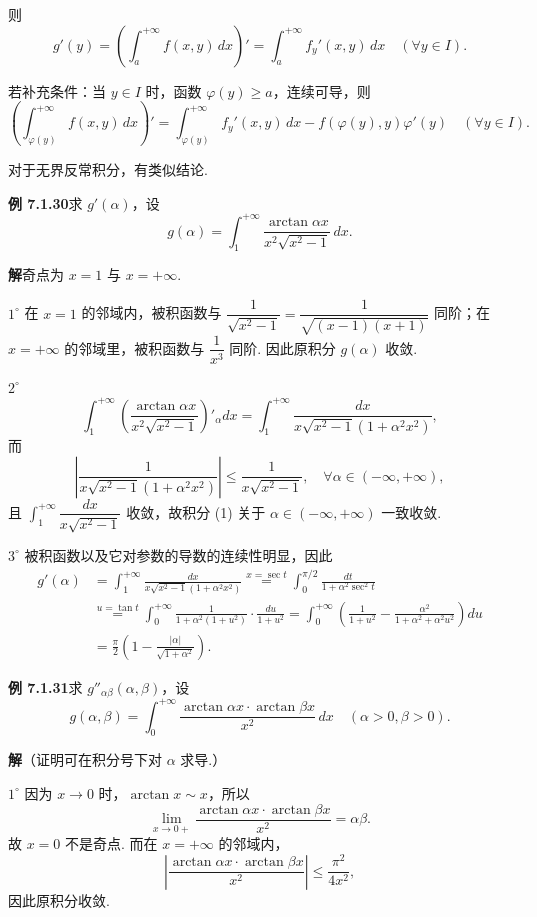 \documentclass[UTF8,12pt,a4paper,fontset=fandol]{ctexart}
\begin{document}
则
\[
g'(y)=\left(\int_a^{+\infty}f(x,y)\,dx\right)'
=\int_a^{+\infty}f_y'(x,y)\,dx\quad(\forall y\in I).
\]

若补充条件：当 $y\in I$ 时，函数 $\varphi(y)\ge a$，连续可导，则
\[
\left(\int_{\varphi(y)}^{+\infty}f(x,y)\,dx\right)'
=\int_{\varphi(y)}^{+\infty}f_y'(x,y)\,dx-f(\varphi(y),y)\varphi'(y)\quad(\forall y\in I).
\]

对于无界反常积分，有类似结论.

\noindent\textbf{例 7.1.30}\quad 求 $g'(\alpha)$，设
\[
g(\alpha)=\int_1^{+\infty}\frac{\arctan\alpha x}{x^2\sqrt{x^2-1}}\,dx.
\]

\noindent\textbf{解}\quad 奇点为 $x=1$ 与 $x=+\infty$.

$1^\circ$ 在 $x=1$ 的邻域内，被积函数与 $\dfrac1{\sqrt{x^2-1}}=\dfrac1{\sqrt{(x-1)(x+1)}}$ 同阶；在 $x=+\infty$ 的邻域里，被积函数与 $\dfrac1{x^3}$ 同阶. 因此原积分 $g(\alpha)$ 收敛.

$2^\circ$
\[
\int_1^{+\infty}\left(\frac{\arctan\alpha x}{x^2\sqrt{x^2-1}}\right)'_\alpha dx
=\int_1^{+\infty}\frac{dx}{x\sqrt{x^2-1}(1+\alpha^2x^2)},
\tag{1}
\]
而
\[
\left|\frac1{x\sqrt{x^2-1}(1+\alpha^2x^2)}\right|
\le\frac1{x\sqrt{x^2-1}},\quad \forall\alpha\in(-\infty,+\infty),
\]
且 $\displaystyle\int_1^{+\infty}\dfrac{dx}{x\sqrt{x^2-1}}$ 收敛，故积分 (1) 关于 $\alpha\in(-\infty,+\infty)$ 一致收敛.

$3^\circ$ 被积函数以及它对参数的导数的连续性明显，因此
\[
\begin{aligned}
g'(\alpha)
&=\int_1^{+\infty}\frac{dx}{x\sqrt{x^2-1}(1+\alpha^2x^2)}
\overset{x=\sec t}{=}\int_0^{\pi/2}\frac{dt}{1+\alpha^2\sec^2 t}\\
&\overset{u=\tan t}{=}\int_0^{+\infty}\frac1{1+\alpha^2(1+u^2)}\cdot\frac{du}{1+u^2}
=\int_0^{+\infty}\left(\frac1{1+u^2}-\frac{\alpha^2}{1+\alpha^2+\alpha^2u^2}\right)du\\
&=\frac{\pi}{2}\left(1-\frac{|\alpha|}{\sqrt{1+\alpha^2}}\right).
\end{aligned}
\]

\noindent\textbf{例 7.1.31}\quad 求 $g''_{\alpha\beta}(\alpha,\beta)$，设
\[
g(\alpha,\beta)=\int_0^{+\infty}\frac{\arctan\alpha x\cdot\arctan\beta x}{x^2}\,dx\quad(\alpha>0,\beta>0).
\]

\noindent\textbf{解}\quad （证明可在积分号下对 $\alpha$ 求导.）

$1^\circ$ 因为 $x\to0$ 时，$\arctan x\sim x$，所以
\[
\lim_{x\to0+}\frac{\arctan\alpha x\cdot\arctan\beta x}{x^2}=\alpha\beta.
\tag{1}
\]
故 $x=0$ 不是奇点. 而在 $x=+\infty$ 的邻域内，
\[
\left|\frac{\arctan\alpha x\cdot\arctan\beta x}{x^2}\right|\le\frac{\pi^2}{4x^2},
\]
因此原积分收敛.
\end{document}
